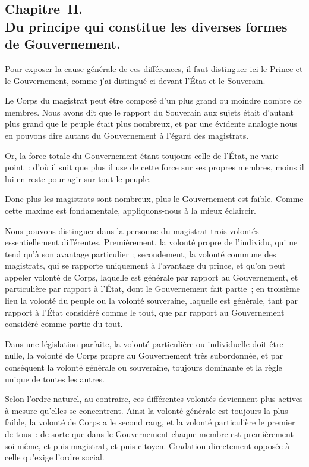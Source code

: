 \documentclass[french,twoside]{book} %
\begin{document}
\subsection[{Chapitre II. Du principe qui constitue les diverses formes de Gouvernement.}]{Chapitre II. \\
Du principe qui constitue les diverses formes de Gouvernement.}
\noindent Pour exposer la cause générale de ces différences, il faut distinguer ici le Prince et le Gouvernement, comme j’ai distingué ci-devant l’État et le Souverain.\par
Le Corps du magistrat peut être composé d’un plus grand ou moindre nombre de membres. Nous avons dit que le rapport du Souverain aux sujets était d’autant plus grand que le peuple était plus nombreux, et par une évidente analogie nous en pouvons dire autant du Gouvernement à l’égard des magistrats.\par
Or, la force totale du Gouvernement étant toujours celle de l’État, ne varie point : d’où il suit que plus il use de cette force sur ses propres membres, moins il lui en reste pour agir sur tout le peuple.\par
Donc plus les magistrats sont nombreux, plus le Gouvernement est faible. Comme cette maxime est fondamentale, appliquons-nous à la mieux éclaircir.\par
Nous pouvons distinguer dans la personne du magistrat trois volontés essentiellement différentes. Premièrement, la volonté propre de l’individu, qui ne tend qu’à son avantage particulier ; secondement, la volonté commune des magistrats, qui se rapporte uniquement à l’avantage du prince, et qu’on peut appeler volonté de Corps, laquelle est générale par rapport au Gouvernement, et particulière par rapport à l’État, dont le Gouvernement fait partie ; en troisième lieu la volonté du peuple ou la volonté souveraine, laquelle est générale, tant par rapport à l’État considéré comme le tout, que par rapport au Gouvernement considéré comme partie du tout.\par
Dans une législation parfaite, la volonté particulière ou individuelle doit être nulle, la volonté de Corps propre au Gouvernement très subordonnée, et par conséquent la volonté générale ou souveraine, toujours dominante et la règle unique de toutes les autres.\par
Selon l’ordre naturel, au contraire, ces différentes volontés deviennent plus actives à mesure qu’elles se concentrent. Ainsi la volonté générale est toujours la plus faible, la volonté de Corps a le second rang, et la volonté particulière le premier de tous : de sorte que dans le Gouvernement chaque membre est premièrement soi-même, et puis magistrat, et puis citoyen. Gradation directement opposée à celle qu’exige l’ordre social.\par
\end{document}
